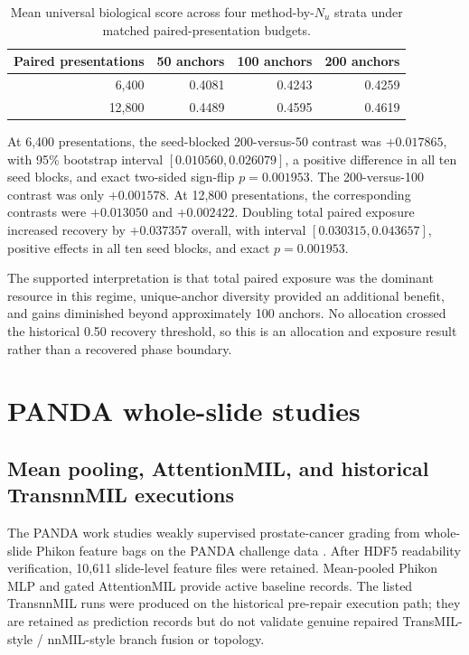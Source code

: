 \begin{table}[!htbp]
\centering
\caption{Mean universal biological score across four method-by-$N_u$ strata under matched paired-presentation budgets.}
\small
\begin{tabular}{rrrr}
\toprule
Paired presentations & 50 anchors & 100 anchors & 200 anchors \\
\midrule
6,400 & 0.4081 & 0.4243 & 0.4259 \\
12,800 & 0.4489 & 0.4595 & 0.4619 \\
\bottomrule
\end{tabular}
\label{tab:matched_budget_means}
\end{table}
\FloatBarrier

At 6,400 presentations, the seed-blocked 200-versus-50 contrast was $+0.017865$, with 95\% bootstrap interval $[0.010560,0.026079]$, a positive difference in all ten seed blocks, and exact two-sided sign-flip $p=0.001953$. The 200-versus-100 contrast was only $+0.001578$. At 12,800 presentations, the corresponding contrasts were $+0.013050$ and $+0.002422$. Doubling total paired exposure increased recovery by $+0.037357$ overall, with interval $[0.030315,0.043657]$, positive effects in all ten seed blocks, and exact $p=0.001953$.

The supported interpretation is that total paired exposure was the dominant resource in this regime, unique-anchor diversity provided an additional benefit, and gains diminished beyond approximately 100 anchors. No allocation crossed the historical 0.50 recovery threshold, so this is an allocation and exposure result rather than a recovered phase boundary.

\section{PANDA whole-slide studies}

\subsection{Mean pooling, AttentionMIL, and historical TransnnMIL executions}
The PANDA work studies weakly supervised prostate-cancer grading from whole-slide Phikon feature bags on the PANDA challenge data \citep{bulten2022artificial}. After HDF5 readability verification, 10,611 slide-level feature files were retained. Mean-pooled Phikon MLP and gated AttentionMIL \citep{ilse2018attention} provide active baseline records. The listed TransnnMIL runs were produced on the historical pre-repair execution path; they are retained as prediction records but do not validate genuine repaired TransMIL-style \citep{shao2021transmil} / nnMIL-style \citep{luo2025nnmil} branch fusion or topology.

